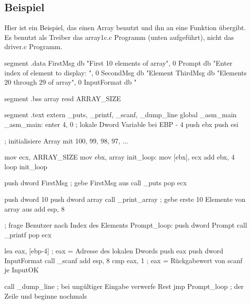 \subsection{Beispiel}
Hier ist ein Beispiel, das einen Array benutzt und ihn an eine
Funktion \"{u}bergibt. Es benutzt als Treiber das {\code array1c.c}
Programm (unten aufgef\"{u}hrt), nicht das {\code driver.c} Programm.
\begin{AsmCodeListing}[label=array1.asm, numbers=left, commandchars=\\\{\}]

 segment .data
 FirstMsg        db   "First 10 elements of array", 0
 Prompt          db   "Enter index of element to display: ", 0
 SecondMsg       db   "Element %
 ThirdMsg        db   "Elements 20 through 29 of array", 0
 InputFormat     db   "%

 segment .bss
 array   resd    ARRAY_SIZE

 segment .text
         extern  _puts, _printf, _scanf, _dump_line
         global  _asm_main
 _asm_main:
         enter   4, 0                   ; lokale Dword Variable bei EBP - 4
         push    ebx
         push    esi

 ; initialisiere Array mit 100, 99, 98, 97, ...

         mov     ecx, ARRAY_SIZE
         mov     ebx, array
 init_loop:
         mov     [ebx], ecx
         add     ebx, 4
         loop    init_loop

         push    dword FirstMsg         ; gebe FirstMsg aus
         call    _puts
         pop     ecx

         push    dword 10
         push    dword array
         call    _print_array           ; gebe erste 10 Elemente von array aus
         add     esp, 8

 ; frage Benutzer nach Index des Elements
 Prompt_loop:
         push    dword Prompt
         call    _printf
         pop     ecx

         lea     eax, [ebp-4]           ; eax = Adresse des lokalen Dwords
         push    eax
         push    dword InputFormat
         call    _scanf
         add     esp, 8
         cmp     eax, 1                 ; eax = R\"{u}ckgabewert von scanf
         je      InputOK

         call    _dump_line             ; bei ung\"{u}ltiger Eingabe verwerfe Rest
         jmp     Prompt_loop            ; der Zeile und beginne nochmals


\end{AsmCodeListing}
